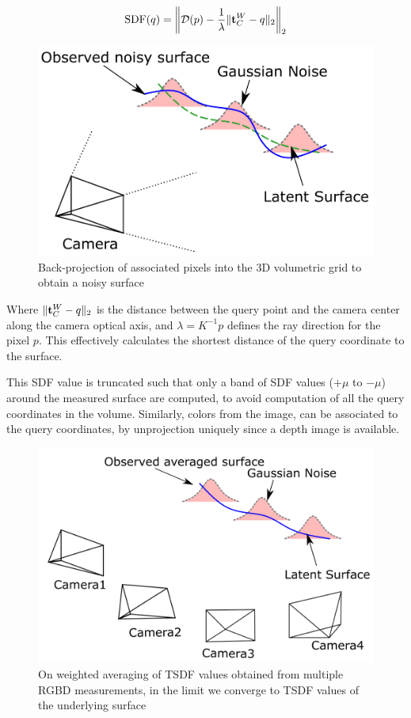 \begin{align}
    \text{SDF}(q) =  \left\lVert \mathcal{D}(p) - \frac{1}{\lambda} \|\mathbf{t}_C^W - q\|_2 \right\rVert_2
\end{align}

\begin{figure}[htpb]
    \centering
    \includegraphics[width=0.6\linewidth]{figs/tsdf-single-image.png}
    \caption{Back-projection of associated pixels into the 3D volumetric grid to obtain a noisy surface}%
    \label{fig:tsdf-single-image}
\end{figure}

 Where $\| \mathbf{t}_C^W - q \|_2$ is the distance between the query point and the camera center along the camera optical axis, and $\lambda = K^{-1} p$ defines the ray direction for the pixel $p$. This effectively calculates the shortest distance of the query coordinate to the surface.

This SDF value is truncated such that only a band of SDF values ($+\mu$ to $-\mu$) around the measured surface are computed, to avoid computation of all the query coordinates in the volume.
Similarly, colors from the image, can be associated to the query coordinates, by unprojection uniquely since a depth image is available.

\begin{figure}[htpb]
    \centering
    \includegraphics[width=0.5\linewidth]{figs/tsdf-multiple-images.png}
    \caption{On weighted averaging of TSDF values obtained from multiple RGBD measurements, in the limit we converge to TSDF values of the underlying surface}%
    \label{fig:tsdf-multiple-images}
\end{figure}

